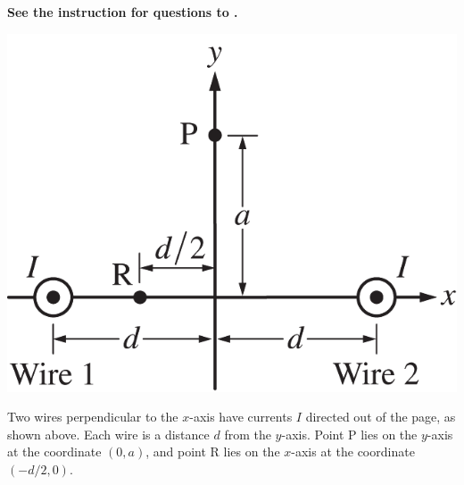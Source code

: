 
\textbf{See the instruction for questions  to .} 

\begin{center}
    \includegraphics[scale=0.3]{images/img-012-019.png}
\end{center}

Two wires perpendicular to the $x$-axis have currents $I$ directed out of the page, as shown above. Each wire is a distance $d$ from the $y$-axis. Point P lies on the $y$-axis at the coordinate $(0, a)$, and point R lies on the $x$-axis at the coordinate $(-d / 2,0)$.

